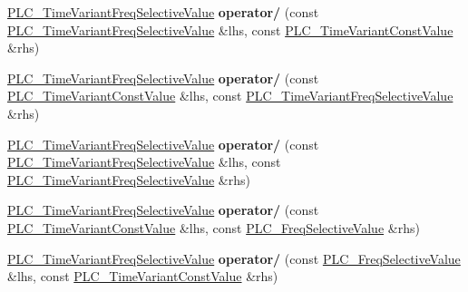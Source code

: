 \begin{DoxyCompactItemize}
\item 
\hypertarget{classns3_1_1PLC__TimeVariantFreqSelectiveValue_a00cee9a2086dada22d57674485f98a0b}{\hyperlink{classns3_1_1PLC__TimeVariantFreqSelectiveValue}{\-P\-L\-C\-\_\-\-Time\-Variant\-Freq\-Selective\-Value} {\bfseries operator/} (const \hyperlink{classns3_1_1PLC__TimeVariantFreqSelectiveValue}{\-P\-L\-C\-\_\-\-Time\-Variant\-Freq\-Selective\-Value} \&lhs, const \hyperlink{classns3_1_1PLC__TimeVariantConstValue}{\-P\-L\-C\-\_\-\-Time\-Variant\-Const\-Value} \&rhs)}\label{classns3_1_1PLC__TimeVariantFreqSelectiveValue_a00cee9a2086dada22d57674485f98a0b}

\item 
\hypertarget{classns3_1_1PLC__TimeVariantFreqSelectiveValue_ae56ed886fc4242d10a08baced5a47ea1}{\hyperlink{classns3_1_1PLC__TimeVariantFreqSelectiveValue}{\-P\-L\-C\-\_\-\-Time\-Variant\-Freq\-Selective\-Value} {\bfseries operator/} (const \hyperlink{classns3_1_1PLC__TimeVariantConstValue}{\-P\-L\-C\-\_\-\-Time\-Variant\-Const\-Value} \&lhs, const \hyperlink{classns3_1_1PLC__TimeVariantFreqSelectiveValue}{\-P\-L\-C\-\_\-\-Time\-Variant\-Freq\-Selective\-Value} \&rhs)}\label{classns3_1_1PLC__TimeVariantFreqSelectiveValue_ae56ed886fc4242d10a08baced5a47ea1}

\item 
\hypertarget{classns3_1_1PLC__TimeVariantFreqSelectiveValue_a3b0dd8dbaa15cf423af89935fbf66f69}{\hyperlink{classns3_1_1PLC__TimeVariantFreqSelectiveValue}{\-P\-L\-C\-\_\-\-Time\-Variant\-Freq\-Selective\-Value} {\bfseries operator/} (const \hyperlink{classns3_1_1PLC__TimeVariantFreqSelectiveValue}{\-P\-L\-C\-\_\-\-Time\-Variant\-Freq\-Selective\-Value} \&lhs, const \hyperlink{classns3_1_1PLC__TimeVariantFreqSelectiveValue}{\-P\-L\-C\-\_\-\-Time\-Variant\-Freq\-Selective\-Value} \&rhs)}\label{classns3_1_1PLC__TimeVariantFreqSelectiveValue_a3b0dd8dbaa15cf423af89935fbf66f69}

\item 
\hypertarget{classns3_1_1PLC__TimeVariantFreqSelectiveValue_a0655c0e755a478cc0b4f5a1c23c9efd9}{\hyperlink{classns3_1_1PLC__TimeVariantFreqSelectiveValue}{\-P\-L\-C\-\_\-\-Time\-Variant\-Freq\-Selective\-Value} {\bfseries operator/} (const \hyperlink{classns3_1_1PLC__TimeVariantConstValue}{\-P\-L\-C\-\_\-\-Time\-Variant\-Const\-Value} \&lhs, const \hyperlink{classns3_1_1PLC__FreqSelectiveValue}{\-P\-L\-C\-\_\-\-Freq\-Selective\-Value} \&rhs)}\label{classns3_1_1PLC__TimeVariantFreqSelectiveValue_a0655c0e755a478cc0b4f5a1c23c9efd9}

\item 
\hypertarget{classns3_1_1PLC__TimeVariantFreqSelectiveValue_ac83aa895ecbeab5a39607bac5dfdd80a}{\hyperlink{classns3_1_1PLC__TimeVariantFreqSelectiveValue}{\-P\-L\-C\-\_\-\-Time\-Variant\-Freq\-Selective\-Value} {\bfseries operator/} (const \hyperlink{classns3_1_1PLC__FreqSelectiveValue}{\-P\-L\-C\-\_\-\-Freq\-Selective\-Value} \&lhs, const \hyperlink{classns3_1_1PLC__TimeVariantConstValue}{\-P\-L\-C\-\_\-\-Time\-Variant\-Const\-Value} \&rhs)}\label{classns3_1_1PLC__TimeVariantFreqSelectiveValue_ac83aa895ecbeab5a39607bac5dfdd80a}


\end{DoxyCompactItemize}
